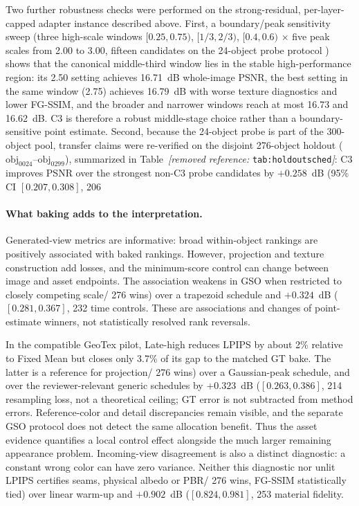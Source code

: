 \documentclass[times,twocolumn,final]{elsarticle}
\providecommand{\DIFadd}[1]{{\protect\color{blue} \sf #1}} %
\providecommand{\DIFdel}[1]{{\protect\color{red} \scriptsize #1}} %
\providecommand{\DIFaddbegin}{} %
\providecommand{\DIFaddend}{} %
\providecommand{\DIFdelbegin}{} %
\providecommand{\DIFdelend}{} %
\begin{document}
\DIFdelbegin \DIFdel{Two further robustness checks were performed on the strong-residual, per-layer-capped adapter instance described above. First, a boundary/peak sensitivity sweep (three high-scale windows $[0.25,0.75)$, $[1/3,2/3)$, $[0.4,0.6)$ $\times$ five peak scales from 2.00 to 3.00, fifteen candidates on the 24-object probe protocol ) shows that the canonical middle-third window lies in the stable high-performance region: its 2.50 setting achieves 16.71~dB whole-image PSNR, the best setting in the same window (2.75) achieves 16.79~dB with worse texture diagnostics and lower FG-SSIM, and the broader and narrower windows reach at most 16.73 and 16.62~dB. C3 is therefore a robust middle-stage choice rather than a boundary-sensitive point estimate. Second, because the 24-object probe is part of the 300-object pool, transfer claims were re-verified on the disjoint 276-object holdout ($\mathrm{obj}_{0024}$--$\mathrm{obj}_{0299}$), summarized in Table~\textit{[removed reference: }\texttt{tab:holdoutsched}\textit{]}: C3 improves PSNR over the strongest non-C3 probe candidates by $+0.258$~dB (95\% CI $[0.207,0.308]$, 206}\DIFdelend \DIFaddbegin \paragraph{What baking adds to the interpretation.}
\DIFadd{Generated-view metrics are informative: broad within-object rankings are positively associated with baked rankings. However, projection and texture construction add losses, and the minimum-score control can change between image and asset endpoints. The association weakens in GSO when restricted to closely competing scale}\DIFaddend /\DIFdelbegin \DIFdel{276 wins) over a trapezoid schedule and $+0.324$~dB ($[0.281,0.367]$, 232}\DIFdelend \DIFaddbegin \DIFadd{time controls. These are associations and changes of point-estimate winners, not statistically resolved rank reversals.
}

\DIFadd{In the compatible GeoTex pilot, Late-high reduces LPIPS by about 2\% relative to Fixed Mean but closes only 3.7\% of its gap to the matched GT bake. The latter is a reference for projection}\DIFaddend /\DIFdelbegin \DIFdel{276 wins) over a Gaussian-peak schedule, and over the reviewer-relevant generic schedules by $+0.323$~dB ($[0.263,0.386]$, 214}\DIFdelend \DIFaddbegin \DIFadd{resampling loss, not a theoretical ceiling; GT error is not subtracted from method errors. Reference-color and detail discrepancies remain visible, and the separate GSO protocol does not detect the same allocation benefit. Thus the asset evidence quantifies a local control effect alongside the much larger remaining appearance problem. Incoming-view disagreement is also a distinct diagnostic: a constant wrong color can have zero variance. Neither this diagnostic nor unlit LPIPS certifies seams, physical albedo or PBR}\DIFaddend /\DIFdelbegin \DIFdel{276 wins, FG-SSIM statistically tied) over linear warm-up and $+0.902$~dB ($[0.824,0.981]$, 253}\DIFdelend \DIFaddbegin \DIFadd{material fidelity.
}
\end{document}
